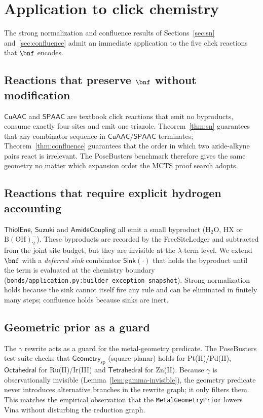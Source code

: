 \section{Application to click chemistry}
\label{sec:click}
The strong normalization and confluence results of Sections~\ref{sec:sn}
and~\ref{sec:confluence} admit an immediate application to the
five click reactions that $\bnf$ encodes.

\subsection{Reactions that preserve $\bnf$ without modification}
$\mathsf{CuAAC}$ and $\mathsf{SPAAC}$ are textbook click reactions that
emit no byproducts, consume exactly four sites and emit one triazole.
Theorem~\ref{thm:sn} guarantees that any combinator sequence in
$\mathsf{CuAAC}/\mathsf{SPAAC}$ terminates; Theorem~\ref{thm:confluence}
guarantees that the order in which two azide-alkyne pairs react is
irrelevant. The PoseBusters benchmark therefore gives the same geometry
no matter which expansion order the MCTS proof search adopts.

\subsection{Reactions that require explicit hydrogen accounting}
$\mathsf{ThiolEne}$, $\mathsf{Suzuki}$ and $\mathsf{AmideCoupling}$ all
emit a small byproduct (\ensuremath{\mathrm{H_2O}}, \ensuremath{\mathrm{HX}} or \ensuremath{\mathrm{B(OH)_2^{-}}}). These
byproducts are recorded by the FreeSiteLedger and subtracted from the
joint site budget, but they are invisible at the $\lambda$-term level. We
extend $\bnf$ with a \emph{deferred sink} combinator $\mathsf{Sink}(\cdot)$
that holds the byproduct until the term is evaluated at the chemistry
boundary (\texttt{bonds/application.py:builder\_exception\_snapshot}).
Strong normalization holds because the sink cannot itself fire any rule
and can be eliminated in finitely many steps; confluence holds because
sinks are inert.

\subsection{Geometric prior as a guard}
The $\gamma$ rewrite acts as a guard for the metal-geometry predicate. The
PoseBusters test suite checks that $\mathsf{Geometry}_{\mathrm{sp}}$
(square-planar) holds for Pt(II)/Pd(II), $\mathsf{Octahedral}$ for
Ru(II)/Ir(III) and $\mathsf{Tetrahedral}$ for Zn(II). Because $\gamma$ is
observationally invisible (Lemma~\ref{lem:gamma-invisible}), the geometry
predicate never introduces alternative branches in the rewrite graph; it
only filters them. This matches the empirical observation that the
\texttt{MetalGeometryPrior} lowers Vina without disturbing the
reduction graph.

